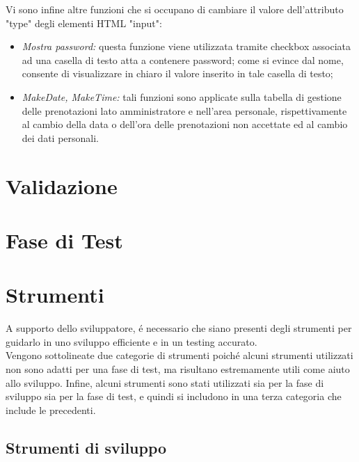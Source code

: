 \documentclass[]{article}
\begin{document}
Vi sono infine altre funzioni che si occupano di cambiare il valore dell'attributo "type" degli elementi HTML "input":
\begin{itemize}
        \item \textit{Mostra password:} questa funzione viene utilizzata tramite checkbox associata ad una casella di testo atta a contenere password; come si evince dal nome, consente di visualizzare in chiaro il valore inserito in tale casella di testo;
        \item \textit{MakeDate, MakeTime:} tali funzioni sono applicate sulla tabella di gestione delle prenotazioni lato amministratore e nell'area personale, rispettivamente al cambio della data o dell'ora delle prenotazioni non accettate ed al cambio dei dati personali.
\end{itemize}
 
\newpage
\section{Validazione}

\newpage
\section{Fase di Test}

\newpage
\section{Strumenti}
A supporto dello sviluppatore, é necessario che siano presenti degli strumenti per guidarlo in uno sviluppo efficiente e in un testing accurato.\\
Vengono sottolineate due categorie di strumenti poiché alcuni strumenti utilizzati non sono adatti per una fase di test, ma risultano estremamente utili come aiuto allo sviluppo. Infine, alcuni strumenti sono stati utilizzati sia per la fase di sviluppo sia per la fase di test, e quindi si includono in una terza categoria che include le precedenti.
\subsection{Strumenti di sviluppo}
\end{document}
